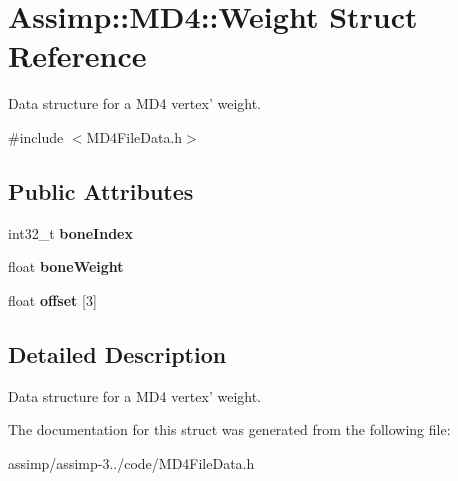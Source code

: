 \hypertarget{struct_assimp_1_1_m_d4_1_1_weight}{\section{Assimp\+:\+:M\+D4\+:\+:Weight Struct Reference}
\label{struct_assimp_1_1_m_d4_1_1_weight}
}


Data structure for a M\+D4 vertex' weight.  




{\ttfamily \#include $<$M\+D4\+File\+Data.\+h$>$}

\subsection*{Public Attributes}
\begin{DoxyCompactItemize}
\item 
\hypertarget{struct_assimp_1_1_m_d4_1_1_weight_a5ec3168097382b0374f2cc88cb39f90d}{int32\+\_\+t {\bfseries bone\+Index}}\label{struct_assimp_1_1_m_d4_1_1_weight_a5ec3168097382b0374f2cc88cb39f90d}

\item 
\hypertarget{struct_assimp_1_1_m_d4_1_1_weight_a20a583c9e70ae2eb4d7a3d0e4c32dc32}{float {\bfseries bone\+Weight}}\label{struct_assimp_1_1_m_d4_1_1_weight_a20a583c9e70ae2eb4d7a3d0e4c32dc32}

\item 
\hypertarget{struct_assimp_1_1_m_d4_1_1_weight_a4700c719db749b337546b07b9f7ec693}{float {\bfseries offset} \mbox{[}3\mbox{]}}\label{struct_assimp_1_1_m_d4_1_1_weight_a4700c719db749b337546b07b9f7ec693}

\end{DoxyCompactItemize}


\subsection{Detailed Description}
Data structure for a M\+D4 vertex' weight. 

The documentation for this struct was generated from the following file\+:\begin{DoxyCompactItemize}
\item 
assimp/assimp-\/3../code/M\+D4\+File\+Data.\+h\end{DoxyCompactItemize}
